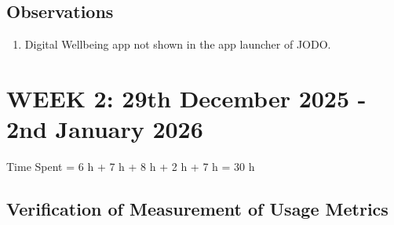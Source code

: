 \documentclass{article}
\begin{document}
\subsection{Observations}
\begin{enumerate}
    \item Digital Wellbeing app not shown in the app launcher of JODO.
\end{enumerate}

\newpage
\section{WEEK 2: 29th December 2025 - 2nd January 2026}
Time Spent = 6 h + 7 h + 8 h + 2 h + 7 h = 30 h  
\subsection{Verification of Measurement of Usage Metrics}
\end{document}
